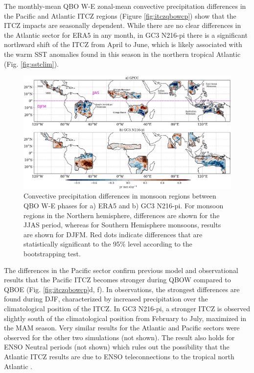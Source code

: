 The monthly-mean QBO W-E zonal-mean convective precipitation differences in the Pacific and Atlantic ITCZ regions (Figure \ref{fig:itczqbowcp}) show that the ITCZ impacts are seasonally dependent.
While there are no clear differences in the Atlantic sector for ERA5 in any month, in GC3 N216-pi there is a significant northward shift of the ITCZ from April to June, which is likely associated with the warm SST anomalies found in this season in the northern tropical Atlantic (Fig. \ref{fig:sstclim}). 

\begin{figure}[t!]
\centering
 \includegraphics[width=\linewidth]{figures/monsoon_gpcc_qbow.png}
\caption[Global monsoon impacts of the QBO.]{ Convective precipitation differences in monsoon regions between QBO W-E  phases for a) ERA5 and b) GC3 N216-pi. For monsoon regions in the Northern hemisphere, differences are shown for the JJAS period, whereas for Southern Hemisphere monsoons, results are shown for DJFM.  Red dots indicate differences that are statistically significant to the 95\% level according to the bootstrapping test.}
\label{fig:mons_map}
\end{figure}

 The differences in the Pacific sector confirm previous model and observational results \citep{gray2018,serva2021} that the Pacific ITCZ becomes stronger during QBOW compared to QBOE (Fig. \ref{fig:itczqbowcp}d, f). In observations, the strongest differences are found during DJF, characterized by increased precipitation over the climatological position of the ITCZ. In GC3 N216-pi, a stronger ITCZ is observed slightly south of the climatological position from February to July, maximized in the MAM season. Very similar results for the Atlantic and Pacific sectors were observed for the other two simulations (not shown). The result also holds for ENSO Neutral periods (not shown) which rules out the possibility that the Atlantic ITCZ results are due to ENSO teleconnections to the tropical north Atlantic \citep{hastenrath2006}. 


